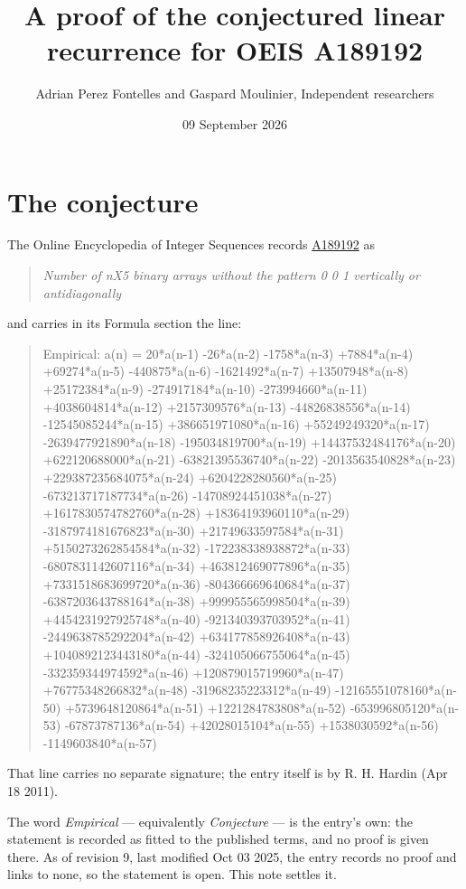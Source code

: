 \documentclass[11pt]{article}
\title{A proof of the conjectured linear recurrence for OEIS A189192}
\author{Adrian Perez Fontelles and Gaspard Moulinier, Independent researchers}
\date{09 September 2026}
\theoremstyle{definition}
\begin{document}
\maketitle
\section{The conjecture}

The Online Encyclopedia of Integer Sequences records \href{https://oeis.org/A189192}{A189192} as

\begin{quote}\itshape Number of nX5 binary arrays without the pattern 0 0 1 vertically or antidiagonally\end{quote}

and carries in its Formula section the line:

\begin{quote}\ttfamily Empirical: a(n) = 20*a(n-1) -26*a(n-2) -1758*a(n-3) +7884*a(n-4) +69274*a(n-5) -440875*a(n-6) -1621492*a(n-7) +13507948*a(n-8) +25172384*a(n-9) -274917184*a(n-10) -273994660*a(n-11) +4038604814*a(n-12) +2157309576*a(n-13) -44826838556*a(n-14) -12545085244*a(n-15) +386651971080*a(n-16) +55249249320*a(n-17) -2639477921890*a(n-18) -195034819700*a(n-19) +14437532484176*a(n-20) +622120688000*a(n-21) -63821395536740*a(n-22) -2013563540828*a(n-23) +229387235684075*a(n-24) +6204228280560*a(n-25) -673213717187734*a(n-26) -14708924451038*a(n-27) +1617830574782760*a(n-28) +18364193960110*a(n-29) -3187974181676823*a(n-30) +21749633597584*a(n-31) +5150273262854584*a(n-32) -172238338938872*a(n-33) -6807831142607116*a(n-34) +463812469077896*a(n-35) +7331518683699720*a(n-36) -804366669640684*a(n-37) -6387203643788164*a(n-38) +999955565998504*a(n-39) +4454231927925748*a(n-40) -921340393703952*a(n-41) -2449638785292204*a(n-42) +634177858926408*a(n-43) +1040892123443180*a(n-44) -324105066755064*a(n-45) -332359344974592*a(n-46) +120879015719960*a(n-47) +76775348266832*a(n-48) -31968235223312*a(n-49) -12165551078160*a(n-50) +5739648120864*a(n-51) +1221284783808*a(n-52) -653996805120*a(n-53) -67873787136*a(n-54) +42028015104*a(n-55) +1538030592*a(n-56) -1149603840*a(n-57)\end{quote}

That line carries no separate signature; the entry itself is by R. H. Hardin (Apr 18 2011).

The word {\itshape Empirical} --- equivalently {\itshape Conjecture} --- is the entry's own: the statement is recorded as fitted to the published terms, and no proof is given there. As of revision 9, last modified Oct 03 2025, the entry records no proof and links to none, so the statement is open. This note settles it.
\end{document}
